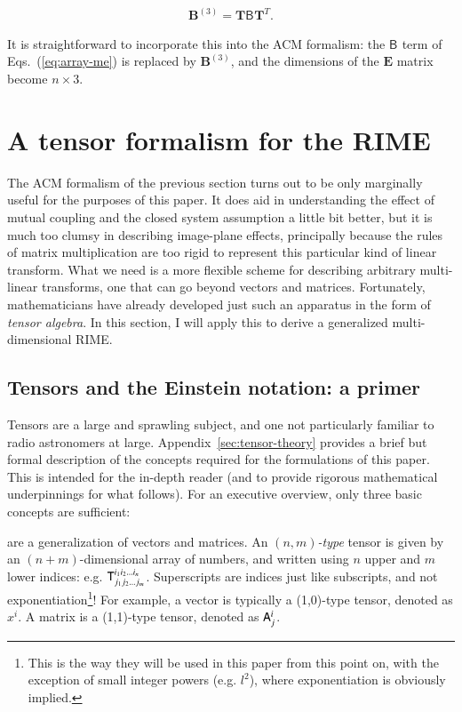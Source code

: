\documentclass[]{aa}
\newcommand{\coh}[2]{\mathsf{{#1}}_{{#2}}}
\begin{document}
\[
  \mathbf{B}^{(3)} = \mathbf{T} \coh{B}{} \mathbf{T}^T.
\]

It is straightforward to incorporate this into the ACM formalism: the $\coh{B}{}$ term of Eqs.~(\ref{eq:array-me}) 
is replaced by $\mathbf{B}^{(3)}$, and the dimensions of the $\mathbf{E}$ matrix become $n\times3$.

\section{A tensor formalism for the RIME}
\label{sec:tensor}

The ACM formalism of the previous section turns out to be only marginally useful for the purposes of this paper. It does aid in understanding the effect of mutual coupling and the closed system assumption a little bit better, but it is much too clumsy in describing image-plane effects, principally because the rules of matrix multiplication are too rigid to represent this particular kind of linear transform. What we need is a more flexible scheme for describing arbitrary multi-linear transforms, one that can go beyond vectors and matrices. Fortunately, mathematicians have already developed just such an apparatus in the form of \emph{tensor algebra}. In this section, I will apply this to derive a generalized multi-dimensional RIME.

\subsection{Tensors and the Einstein notation: a primer}

Tensors are a large and sprawling subject, and one not particularly familiar to radio astronomers at large. Appendix~\ref{sec:tensor-theory} provides a brief but formal description of the concepts required for the formulations of this paper. This is intended for the in-depth reader (and to provide rigorous mathematical underpinnings for what follows). For an executive overview, only three basic concepts are sufficient:
  
 are a generalization of vectors and matrices. An \emph{$(n,m)$-type} tensor is given by an $(n+m)$-dimensional array of numbers, and written using $n$ upper and $m$ lower indices: e.g. $\mathsf{T}_{j_{1}j_{2}...j_{m}}^{i_{1}i_{2}...i_{n}}$. Superscripts are indices just like subscripts, and not exponentiation\footnote{This is the way they will be used in this paper from this point on, with the exception of small integer powers (e.g. $l^2$), where exponentiation is obviously implied.}! For example, a vector is typically a (1,0)-type tensor, denoted as $x^i$. A matrix is a (1,1)-type tensor, denoted as $\mathsf{A}^i_j$.
\end{document}
